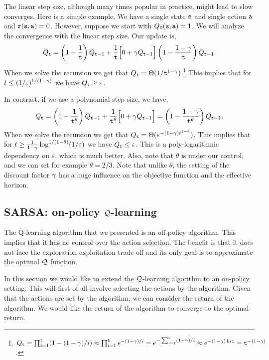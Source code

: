 The linear step size, although many times popular in practice, might
lead to slow converges. Here is a simple example. We have a single
state ${\tt s}$ and single action ${\tt a}$ and
${\tt r}({\tt s},{\tt a})=0$. However, suppose we start with
$Q_0({\tt s},{\tt a})=1$. We will analyze the convergence with the
linear step size. Our update is,
\[
Q_{\tt t} =
\left(1-\frac{1}{{\tt t}}\right)Q_{{\tt t}-1}+\frac{1}{{\tt t}}\Big[0+\gamma
Q_{{\tt t}-1}\Big]\left(1-\frac{1-\gamma}{{\tt t}}\right)Q_{{\tt t}-1}.
\]
When we solve the recursion we get that
$Q_{\tt t}=\Theta(1/{\tt t}^{1-\gamma})$.\footnote{$Q_{\tt t}=\prod_{i=1}^{\tt t} (1-(1-\gamma)/i)\approx
\prod_{i=1}^{\tt t} e^{-(1-\gamma)/i}=e^{-\sum_{i=1}^{\tt t}
(1-\gamma)/i }\approx e^{-(1-\gamma)\ln
{\tt t}}={\tt t}^{-(1-\gamma)}$. }
%
This implies that for $t\leq  (1/\varepsilon)^{1/(1-\gamma)}$ we
have $Q_{\tt t} \geq \varepsilon$.

In contrast, if we use a polynomial step size, we have,
\[
Q_{\tt t} =
\left(1-\frac{1}{{\tt t}^\theta}\right)Q_{{\tt t}-1}+\frac{1}{{\tt t}^\theta}\Big[0+\gamma
Q_{{\tt t}-1}\Big]=\left(1-\frac{1-\gamma}{{\tt t}^\theta}\right)Q_{{\tt t}-1}.
\]
When we solve the recursion we get that
$Q_{\tt t}=\Theta(e^{-(1-\gamma)t^{1-\theta}})$. This implies that
for $t\geq \frac{1}{1-\gamma}\log^{1/(1-\theta)} (1/\varepsilon)$
we have $Q_{\tt t} \leq \varepsilon$. This is a poly-logarithmic
dependency on $\varepsilon$, which is much better. Also, note that
$\theta$ is under our control, and we can set for example
$\theta=2/3$. Note that unlike $\theta$, the setting of the discount
factor $\gamma$ has a huge influence on the objective function
and the effective horizon.

\subsection{SARSA: on-policy $\mathcal{Q}$-learning}

The Q-learning algorithm that we presented is an off-policy
algorithm. This implies that it has no control over the action
selection. The benefit is that it does not face the exploration
exploitation trade-off and its only goal is to approximate the
optimal $\mathcal{Q}$ function.

In this section we would like to extend the $\mathcal{Q}$-learning algorithm
to an on-policy setting. This will first of all involve selecting
the actions by the algorithm. Given that the actions are set by the
algorithm, we can consider the return of the algorithm. We would
like the return of the algorithm to converge to the optimal return.


